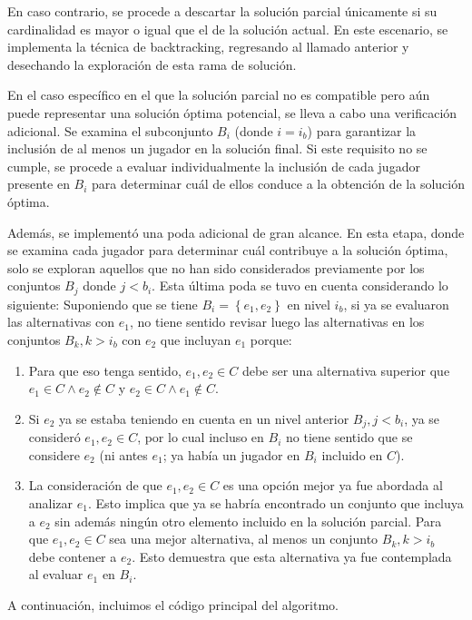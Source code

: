 En caso contrario, se procede a descartar la solución parcial únicamente si su cardinalidad es mayor o igual que el de la solución actual. En este escenario, se implementa la técnica de backtracking, regresando al llamado anterior y desechando la exploración de esta rama de solución.

En el caso específico en el que la solución parcial no es compatible pero aún puede representar una solución óptima potencial, se lleva a cabo una verificación adicional. Se examina el subconjunto $B_i$ (donde $i=i_b$) para garantizar la inclusión de al menos un jugador en la solución final. Si este requisito no se cumple, se procede a evaluar individualmente la inclusión de cada jugador presente en $B_i$ para determinar cuál de ellos conduce a la obtención de la solución óptima.


Además, se implementó una poda adicional de gran alcance. En esta etapa, donde se examina cada jugador para determinar cuál contribuye a la solución óptima, solo se exploran aquellos que no han sido considerados previamente por los conjuntos $B_j$ donde $j<b_i$.
Esta última poda se tuvo en cuenta considerando lo siguiente:
Suponiendo que se tiene $B_i=\left\{e_1, e_2\right\}$ en nivel $i_b$, si ya se evaluaron las alternativas con $e_1$, no tiene sentido revisar luego las alternativas en los conjuntos $B_k, k>i_b$ con $e_2$ que incluyan $e_1$ porque:

\begin{enumerate}
    \item Para que eso tenga sentido, $e_1,e_2 \in C$ debe ser una alternativa superior que $e_1\in C \land e_2 \notin C$ y $e_2\in C \land e_1 \notin C$.

    \item Si $e_2$ ya se estaba teniendo en cuenta en un nivel anterior $B_j, j<b_i$, ya se consideró  $e_1,e_2 \in C$, por lo cual incluso en $B_i$ no tiene sentido que se considere $e_2$ (ni antes $e_1$; ya había un jugador en $B_i$ incluido en $C$).
    
    \item La consideración de que $e_1,e_2 \in C$ es una opción mejor ya fue abordada al analizar $e_1$. Esto implica que ya se habría encontrado un conjunto que incluya a $e_2$ sin además ningún otro elemento incluido en la solución parcial. Para que $e_1,e_2 \in C$ sea una mejor alternativa, al menos un conjunto $B_k, k>i_b$ debe contener a $e_2$. Esto demuestra que esta alternativa ya fue contemplada al evaluar $e_1$ en $B_i$.
\end{enumerate}

A continuación, incluimos el código principal del algoritmo.


